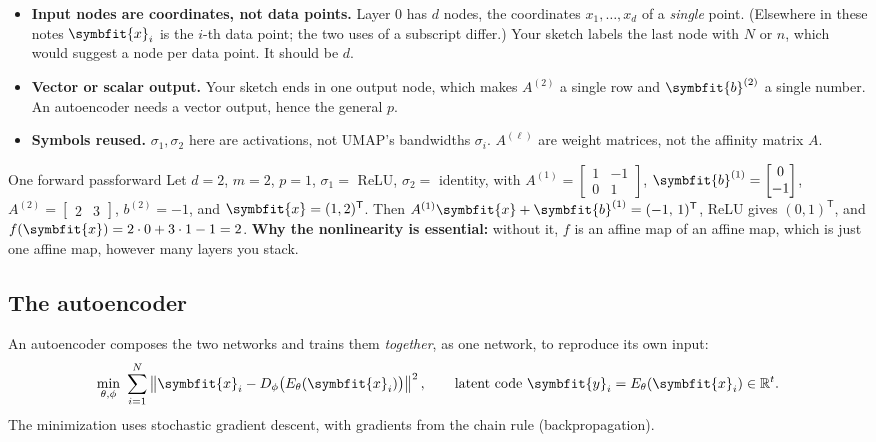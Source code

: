 \documentclass[11pt]{article}
\newcommand{\bm}[1]{\symbfit{#1}}
\newcommand{\R}{\mathbb{R}}
\newcommand{\vx}{\bm{x}}
\newcommand{\T}{^{\mathsf T}}
\newcommand{\norm}[1]{\left\lVert #1\right\rVert}
\begin{document}
\begin{careful}
\begin{itemize}[nosep,leftmargin=*]
\item \textbf{Input nodes are coordinates, not data points.} Layer 0 has $d$ nodes, the coordinates $x_1,\dots,x_d$ of a \emph{single} point. (Elsewhere in these notes $\vx_i$ is the $i$-th data point; the two uses of a subscript differ.) Your sketch labels the last node with $N$ or $n$, which would suggest a node per data point. It should be $d$.
\item \textbf{Vector or scalar output.} Your sketch ends in one output node, which makes $A^{(2)}$ a single row and $\bm b^{(2)}$ a single number. An autoencoder needs a vector output, hence the general $p$.
\item \textbf{Symbols reused.} $\sigma_1,\sigma_2$ here are activations, not UMAP's bandwidths $\sigma_i$. $A^{(\ell)}$ are weight matrices, not the affinity matrix $A$.
\end{itemize}
\end{careful}

\begin{example}{One forward pass}{forward}
Let $d=2$, $m=2$, $p=1$, $\sigma_1=$ ReLU, $\sigma_2=$ identity, with
$A^{(1)}=\begin{bmatrix}1&-1\\0&1\end{bmatrix}$, $\bm b^{(1)}=\begin{bmatrix}0\\-1\end{bmatrix}$, $A^{(2)}=\begin{bmatrix}2&3\end{bmatrix}$, $b^{(2)}=-1$, and $\vx=(1,2)\T$.
Then $A^{(1)}\vx+\bm b^{(1)}=(-1,\,1)\T$, ReLU gives $(0,1)\T$, and $f(\vx)=2\cdot0+3\cdot1-1=2$.
\textbf{Why the nonlinearity is essential:} without it, $f$ is an affine map of an affine map, which is just one affine map, however many layers you stack.
\end{example}

\subsection{The autoencoder}

An autoencoder composes the two networks and trains them \emph{together}, as one network, to reproduce its own input:
\[
\min_{\theta,\phi}\ \sum_{i=1}^N\norm{\vx_i-D_\phi\big(E_\theta(\vx_i)\big)}^2,\qquad\text{latent code }\bm y_i=E_\theta(\vx_i)\in\R^t .
\]
The minimization uses stochastic gradient descent, with gradients from the chain rule (backpropagation).
\end{document}
